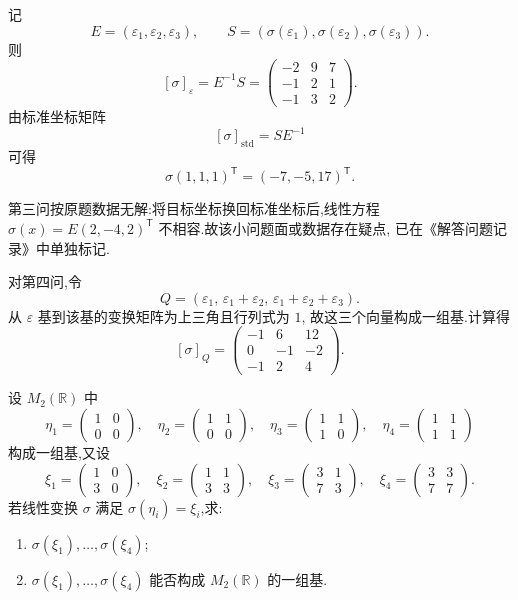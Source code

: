 \begin{solution}
记
\[
E=(\varepsilon_1,\varepsilon_2,\varepsilon_3),
\qquad
S=(\sigma(\varepsilon_1),\sigma(\varepsilon_2),\sigma(\varepsilon_3)).
\]
则
\[
[\sigma]_{\varepsilon}
=
E^{-1}S
=
\boxed{
\begin{pmatrix}
-2&9&7\\
-1&2&1\\
-1&3&2
\end{pmatrix}
}.
\]
由标准坐标矩阵
\[
[\sigma]_{\mathrm{std}}=SE^{-1}
\]
可得
\[
\boxed{
\sigma(1,1,1)^{\mathsf T}
=
(-7,-5,17)^{\mathsf T}
}.
\]

第三问按原题数据无解:将目标坐标换回标准坐标后,线性方程
$\sigma(x)=E(2,-4,2)^{\mathsf T}$ 不相容.故该小问题面或数据存在疑点,
已在《解答问题记录》中单独标记.

对第四问,令
\[
Q=
(\varepsilon_1,\,
\varepsilon_1+\varepsilon_2,\,
\varepsilon_1+\varepsilon_2+\varepsilon_3).
\]
从 $\varepsilon$ 基到该基的变换矩阵为上三角且行列式为 $1$,
故这三个向量构成一组基.计算得
\[
\boxed{
[\sigma]_Q
=
\begin{pmatrix}
-1&6&12\\
0&-1&-2\\
-1&2&4
\end{pmatrix}
}.
\]
\end{solution}


\begin{example}
设 $M_2(\mathbb{R})$ 中
\[
\eta_1=
\begin{pmatrix}1&0\\0&0\end{pmatrix},\quad
\eta_2=
\begin{pmatrix}1&1\\0&0\end{pmatrix},\quad
\eta_3=
\begin{pmatrix}1&1\\1&0\end{pmatrix},\quad
\eta_4=
\begin{pmatrix}1&1\\1&1\end{pmatrix}
\]
构成一组基,又设
\[
\xi_1=
\begin{pmatrix}1&0\\3&0\end{pmatrix},\quad
\xi_2=
\begin{pmatrix}1&1\\3&3\end{pmatrix},\quad
\xi_3=
\begin{pmatrix}3&1\\7&3\end{pmatrix},\quad
\xi_4=
\begin{pmatrix}3&3\\7&7\end{pmatrix}.
\]
若线性变换 $\sigma$ 满足 $\sigma(\eta_i)=\xi_i$,求:
\begin{enumerate}
    \item $\sigma(\xi_1),\ldots,\sigma(\xi_4)$;
    \item $\sigma(\xi_1),\ldots,\sigma(\xi_4)$ 能否构成 $M_2(\mathbb{R})$ 的一组基.
\end{enumerate}
\end{example}
\exampleblank

